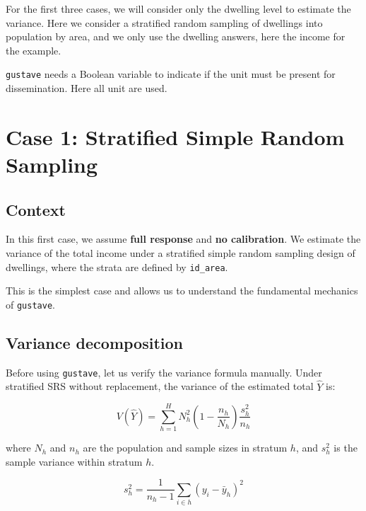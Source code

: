 \documentclass[
]{article}
\newenvironment{Shaded}{\begin{snugshade}}{\end{snugshade}}
\newcommand{\ConstantTok}[1]{\textcolor[rgb]{0.56,0.35,0.01}{#1}}
\newcommand{\NormalTok}[1]{#1}
\newcommand{\OtherTok}[1]{\textcolor[rgb]{0.56,0.35,0.01}{#1}}
\newcommand{\SpecialCharTok}[1]{\textcolor[rgb]{0.81,0.36,0.00}{\textbf{#1}}}
\begin{document}
For the first three cases, we will consider only the dwelling level to
estimate the variance. Here we consider a stratified random sampling of
dwellings into population by area, and we only use the dwelling answers,
here the income for the example.

\texttt{gustave} needs a Boolean variable to indicate if the unit must
be present for dissemination. Here all unit are used.

\begin{Shaded}
\end{Shaded}

\section{Case 1: Stratified Simple Random
Sampling}\label{case-1-stratified-simple-random-sampling}

\subsection{Context}\label{context}

In this first case, we assume \textbf{full response} and \textbf{no
calibration}. We estimate the variance of the total income under a
stratified simple random sampling design of dwellings, where the strata
are defined by \texttt{id\_area}.

This is the simplest case and allows us to understand the fundamental
mechanics of \texttt{gustave}.

\subsection{Variance decomposition}\label{variance-decomposition}

Before using \texttt{gustave}, let us verify the variance formula
manually. Under stratified SRS without replacement, the variance of the
estimated total \(\hat{Y}\) is:

\[V(\hat{Y}) = \sum_{h=1}^{H} N_h^2 \left(1 - \frac{n_h}{N_h}\right) \frac{s_h^2}{n_h}\]

where \(N_h\) and \(n_h\) are the population and sample sizes in stratum
\(h\), and \(s_h^2\) is the sample variance within stratum \(h\).

\[s_h^2 = \frac{1}{n_h - 1} \sum_{i \in h} \left(y_i - \bar y_h \right)^2\]
\end{document}

